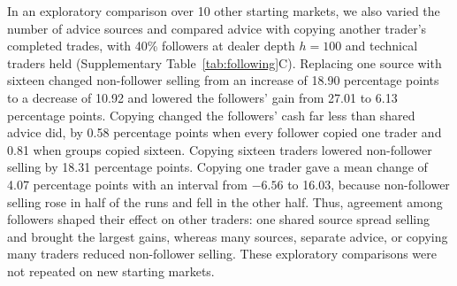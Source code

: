In an exploratory comparison over 10 other starting markets, we also
varied the number of advice sources and compared advice with copying
another trader's completed trades, with 40\% followers at dealer depth
$h=100$ and technical traders held (Supplementary
Table~\ref{tab:following}C). Replacing one source with sixteen changed
non-follower selling from an increase of 18.90 percentage points to a
decrease of 10.92 and lowered the followers' gain from 27.01 to 6.13
percentage points. Copying changed the followers' cash far less than
shared advice did, by 0.58 percentage points when every follower copied
one trader and 0.81 when groups copied sixteen. Copying sixteen traders
lowered non-follower selling by 18.31 percentage points. Copying one
trader gave a mean change of 4.07 percentage points with an interval
from $-6.56$ to 16.03, because non-follower selling rose in half of the
runs and fell in the other half. Thus, agreement among followers shaped
their effect on other traders: one shared source spread
selling and brought the largest gains, whereas many sources, separate
advice, or copying many traders reduced non-follower selling. These
exploratory comparisons were not repeated on new starting markets.
